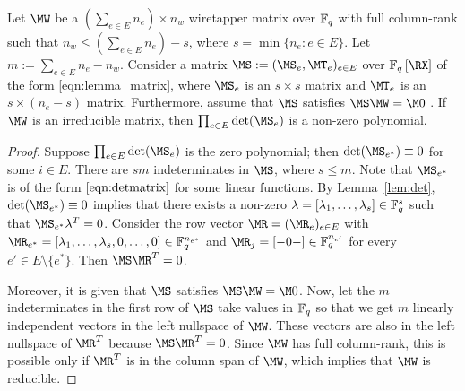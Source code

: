 \begin{lemma}\label{lem:nonzeropoly}
Let $\MW$ be a $(\sum_{e \in E} n_e) \times  n_w$ wiretapper  matrix over $\mathbb{F}_q$ with full column-rank such that $n_w  \leq (\sum_{e \in E}n_e)-s$, where $s=\min\{n_e: e \in E\}$. Let $m := \sum_{e \in E}n_e - n_w $. Consider a  matrix $\MS:=(\MS_e, \MT_e)_{e \in E}$ over $\Fq\left[\RX\right]$ of the form \eqref{eqn:lemma_matrix}, where $\MS_e$ is an $s \times s$ matrix and $\MT_e$ is an $s \times (n_e -s)$ matrix. Furthermore, assume that $\MS$ satisfies $\MS\MW=\M0$ . If $\MW$ is an irreducible matrix, then $\prod_{e\in E} \det (\MS_e)$ is a non-zero polynomial.
\end{lemma}
\begin{proof}
 Suppose  $\prod_{e\in E} \det (\MS_e)$ is the zero polynomial; then $ \det (\MS_{e^*}) \equiv 0$ for some $i\in E$. There are $sm$ indeterminates in $\MS$, where $s\leq m$. Note that $\MS_{e^*}$ is of the form $\eqref{eqn:detmatrix}$ for some linear functions. By Lemma~\ref{lem:det}, $ \det (\MS_{e^*}) \equiv 0$ implies that there exists a non-zero $\lambda = [\lambda_1, \ldots, \lambda_s]  \in \mathbb{F}_q^s$ such that $ \MS_{e^*} \lambda^T= 0$.  Consider the row vector $\MR=(\MR_e)_{e \in E}$ with $\MR_{e^*} = [\lambda_1, \ldots, \lambda_s, 0,\ldots, 0]\in \Fq^{n_{e^*}}$ and  $\MR_j =[- 0 -]\in \Fq^{n_{e'}}$ for every $e' \in E \setminus \{e^*\}$. Then $ \MS \MR^T= 0$. 
 
 Moreover, it is given that $\MS$ satisfies $\MS\MW=\M0$. Now, let the $m$ indeterminates in the first row of $\MS$ take values in $\mathbb{F}_q$ so that we get $m$ linearly independent vectors in the left nullspace of $\MW$. These vectors are also in the left nullspace of $\MR^T$ because $\MS \MR^T= 0$. Since $\MW$ has full column-rank, this is possible only if $\MR^T$ is in the column span of $\MW$, which implies that $\MW$ is reducible.  
 
 
\end{proof}
 
 
 
 



